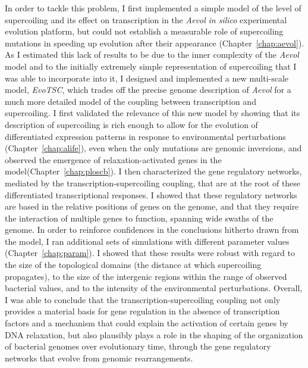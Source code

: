 In order to tackle this problem, I first implemented a simple model of the level of supercoiling and its effect on transcription in the \emph{Aevol} \emph{in silico} experimental evolution platform, but could not establish a measurable role of supercoiling mutations in speeding up evolution after their appearance (Chapter~\ref{chap:aevol}).
As I estimated this lack of results to be due to the inner complexity of the \emph{Aevol} model and to the initially extremely simple representation of supercoiling that I was able to incorporate into it, I designed and implemented a new multi-scale model, \emph{EvoTSC}, which trades off the precise genome description of \emph{Aevol} for a much more detailed model of the coupling between transcription and supercoiling.
I first validated the relevance of this new model by showing that its description of supercoiling is rich enough to allow for the evolution of differentiated expression patterns in response to environmental perturbations (Chapter~\ref{chap:alife}), even when the only mutations are genomic inversions, and observed the emergence of relaxation-activated genes in the model(Chapter~\ref{chap:ploscb}).
I then characterized the gene regulatory networks, mediated by the  transcription-supercoiling coupling, that are at the root of these differentiated transcriptional responses.
I showed that these regulatory networks are based in the relative positions of genes on the genome, and that they require the interaction of multiple genes to function, spanning wide swaths of the genome.
In order to reinforce confidences in the conclusions hitherto drawn from the model, I ran additional sets of simulations with different parameter values (Chapter~\ref{chap:param}).
I showed that these results were robust with regard to the size of the topological domains (the distance at which supercoiling propagates), to the size of the intergenic regions within the range of observed bacterial values, and to the intensity of the environmental perturbations.
Overall, I was able to conclude that the transcription-supercoiling coupling not only provides a material basis for gene regulation in the absence of transcription factors and a mechanism that could explain the activation of certain genes by DNA relaxation, but also plausibly plays a role in the shaping of the organization of bacterial genomes over evolutionary time, through the gene regulatory networks that evolve from genomic rearrangements.

